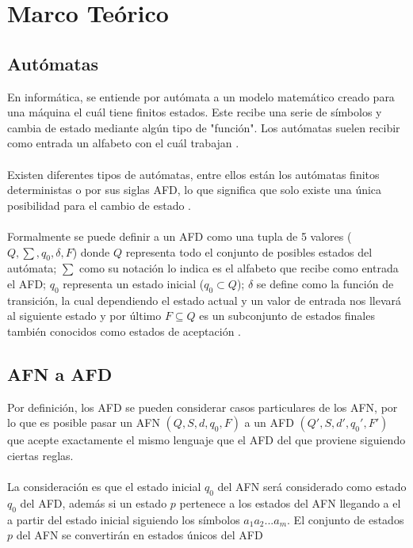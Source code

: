 \documentclass{article}
\begin{document}
	\section{Marco Teórico}
	
	\subsection{Autómatas}
	
	En informática, se entiende por autómata a un modelo matemático creado para una máquina el cuál tiene finitos estados. Este recibe una serie de símbolos y cambia de estado mediante algún tipo de "función". Los autómatas suelen recibir como entrada un alfabeto con el cuál trabajan \cite{Huaman2018}.
	\\\\Existen diferentes tipos de autómatas, entre ellos están los autómatas finitos deterministas o por sus siglas AFD, lo que significa que solo existe una única posibilidad para el cambio de estado \cite{Huaman2018}.
	\\\\Formalmente se puede definir a un AFD como una tupla de 5 valores ($Q, \sum, q_0, \delta, F$) donde $Q$ representa todo el conjunto de posibles estados del autómata; $\sum$ como su notación lo indica es el alfabeto que recibe como entrada el AFD; $q_0$ representa un estado inicial ($q_0 \subset Q$); $\delta$ se define como la función de transición, la cual dependiendo el estado actual y un valor de entrada nos llevará al siguiente estado y por último $F \subseteq Q$ es un subconjunto de estados finales también conocidos como estados de aceptación \cite{Wikipedia2019}.
	
	\subsection{AFN a AFD}
	
	Por definición, los AFD se pueden considerar casos particulares de los AFN, por lo que es posible pasar un AFN $(Q, S, d, q_0, F)$ a un AFD $(Q', S, d', q_0', F')$ que acepte exactamente el mismo lenguaje que el AFD del que proviene siguiendo ciertas reglas.
	\\\\La consideración es que el estado inicial $q_0$ del AFN será considerado como estado ${q_0}$ del AFD, además si un estado $p$ pertenece a los estados del AFN llegando a el a partir del estado inicial siguiendo los símbolos $a_1a_2...a_m$. El conjunto de estados $p$ del AFN se convertirán en estados únicos del AFD \cite{scrigroup2023}
	
\end{document}
